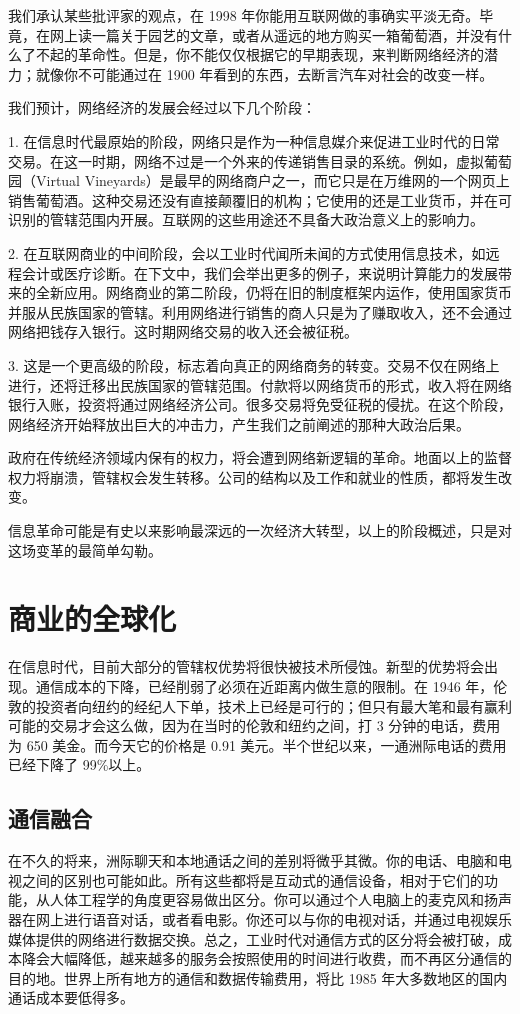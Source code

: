 我们承认某些批评家的观点，在 1998 年你能用互联网做的事确实平淡无奇。毕竟，在网上读一篇关于园艺的文章，或者从遥远的地方购买一箱葡萄酒，并没有什么了不起的革命性。但是，你不能仅仅根据它的早期表现，来判断网络经济的潜力；就像你不可能通过在 1900 年看到的东西，去断言汽车对社会的改变一样。

我们预计，网络经济的发展会经过以下几个阶段：

1. 在信息时代最原始的阶段，网络只是作为一种信息媒介来促进工业时代的日常交易。在这一时期，网络不过是一个外来的传递销售目录的系统。例如，虚拟葡萄园（Virtual Vineyards）是最早的网络商户之一，而它只是在万维网的一个网页上销售葡萄酒。这种交易还没有直接颠覆旧的机构；它使用的还是工业货币，并在可识别的管辖范围内开展。互联网的这些用途还不具备大政治意义上的影响力。

2. 在互联网商业的中间阶段，会以工业时代闻所未闻的方式使用信息技术，如远程会计或医疗诊断。在下文中，我们会举出更多的例子，来说明计算能力的发展带来的全新应用。网络商业的第二阶段，仍将在旧的制度框架内运作，使用国家货币并服从民族国家的管辖。利用网络进行销售的商人只是为了赚取收入，还不会通过网络把钱存入银行。这时期网络交易的收入还会被征税。

3. 这是一个更高级的阶段，标志着向真正的网络商务的转变。交易不仅在网络上进行，还将迁移出民族国家的管辖范围。付款将以网络货币的形式，收入将在网络银行入账，投资将通过网络经济公司。很多交易将免受征税的侵扰。在这个阶段，网络经济开始释放出巨大的冲击力，产生我们之前阐述的那种大政治后果。

政府在传统经济领域内保有的权力，将会遭到网络新逻辑的革命。地面以上的监督权力将崩溃，管辖权会发生转移。公司的结构以及工作和就业的性质，都将发生改变。

信息革命可能是有史以来影响最深远的一次经济大转型，以上的阶段概述，只是对这场变革的最简单勾勒。

\section{商业的全球化}
在信息时代，目前大部分的管辖权优势将很快被技术所侵蚀。新型的优势将会出现。通信成本的下降，已经削弱了必须在近距离内做生意的限制。在 1946 年，伦敦的投资者向纽约的经纪人下单，技术上已经是可行的；但只有最大笔和最有赢利可能的交易才会这么做，因为在当时的伦敦和纽约之间，打 3 分钟的电话，费用为 650 美金。而今天它的价格是 0.91 美元。半个世纪以来，一通洲际电话的费用已经下降了 99\%以上。

\subsection{通信融合}
在不久的将来，洲际聊天和本地通话之间的差别将微乎其微。你的电话、电脑和电视之间的区别也可能如此。所有这些都将是互动式的通信设备，相对于它们的功能，从人体工程学的角度更容易做出区分。你可以通过个人电脑上的麦克风和扬声器在网上进行语音对话，或者看电影。你还可以与你的电视对话，并通过电视娱乐媒体提供的网络进行数据交换。总之，工业时代对通信方式的区分将会被打破，成本降会大幅降低，越来越多的服务会按照使用的时间进行收费，而不再区分通信的目的地。世界上所有地方的通信和数据传输费用，将比 1985 年大多数地区的国内通话成本要低得多。

